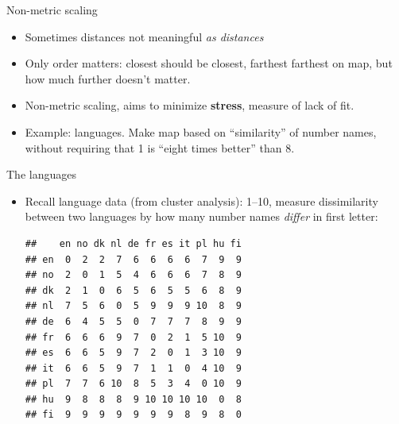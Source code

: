 \begin{frame}[fragile]{Non-metric scaling}
  
  \begin{itemize}
  \item Sometimes distances not meaningful \emph{as distances}
  \item Only order matters: closest should be closest, farthest
    farthest on map, but how much further doesn't matter.
  \item Non-metric scaling, aims to minimize \textbf{stress}, measure
    of lack of fit.
  \item Example: languages. Make map based on ``similarity'' of number
    names, without requiring that 1 is ``eight times better'' than 8.
  \end{itemize}
  
\end{frame}

\begin{frame}[fragile]{The languages}

  \begin{itemize}
  \item Recall language data (from cluster analysis): 1--10, measure dissimilarity between two languages by how many number names {\em differ} in first letter:

    
\begin{knitrout}
\color{fgcolor}\begin{kframe}
\begin{alltt}
\hlkwb{=}\hlstd{(}\hlstd{,}
\end{alltt}
\begin{verbatim}
##    en no dk nl de fr es it pl hu fi
## en  0  2  2  7  6  6  6  6  7  9  9
## no  2  0  1  5  4  6  6  6  7  8  9
## dk  2  1  0  6  5  6  5  5  6  8  9
## nl  7  5  6  0  5  9  9  9 10  8  9
## de  6  4  5  5  0  7  7  7  8  9  9
## fr  6  6  6  9  7  0  2  1  5 10  9
## es  6  6  5  9  7  2  0  1  3 10  9
## it  6  6  5  9  7  1  1  0  4 10  9
## pl  7  7  6 10  8  5  3  4  0 10  9
## hu  9  8  8  8  9 10 10 10 10  0  8
## fi  9  9  9  9  9  9  9  8  9  8  0
\end{verbatim}
\end{kframe}
\end{knitrout}




  \end{itemize}
  
\end{frame}

